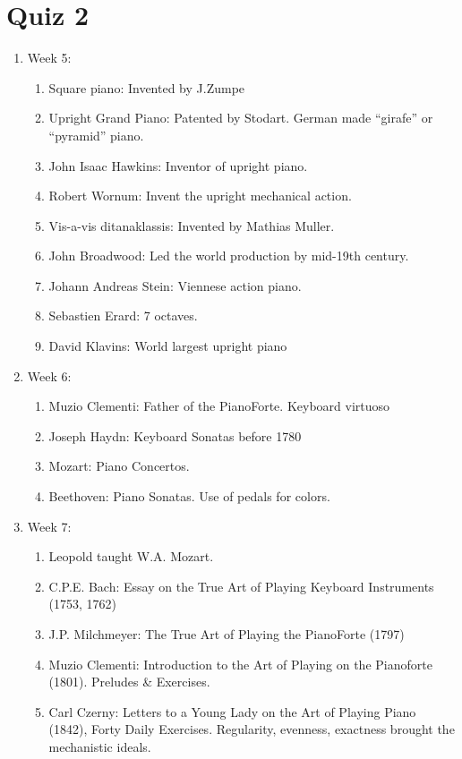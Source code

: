 \documentclass[math,code]{amznotes}
\theoremstyle{remark}
\begin{document}
\section{Quiz 2}
\begin{enumerate}
    \item Week 5:
    \begin{enumerate}
        \item Square piano: Invented by J.Zumpe
        \item Upright Grand Piano: Patented by Stodart. German made ``girafe'' or ``pyramid'' piano.
        \item John Isaac Hawkins: Inventor of upright piano.
        \item Robert Wornum: Invent the upright mechanical action.
        \item Vis-a-vis ditanaklassis: Invented by Mathias Muller.
        \item John Broadwood: Led the world production by mid-19th century.
        \item Johann Andreas Stein: Viennese action piano.
        \item Sebastien Erard: 7 octaves.
        \item David Klavins: World largest upright piano
    \end{enumerate}
    \item Week 6:
    \begin{enumerate}
        \item Muzio Clementi: Father of the PianoForte. Keyboard virtuoso
        \item Joseph Haydn: Keyboard Sonatas before 1780
        \item Mozart: Piano Concertos.
        \item Beethoven: Piano Sonatas. Use of pedals for colors.
    \end{enumerate}
    \item Week 7:
    \begin{enumerate}
        \item Leopold taught W.A. Mozart.
        \item C.P.E. Bach: Essay on the True Art of Playing Keyboard Instruments (1753, 1762)
        \item J.P. Milchmeyer: The True Art of Playing the PianoForte (1797)
        \item Muzio Clementi: Introduction to the Art of Playing on the Pianoforte (1801). Preludes \& Exercises.
        \item Carl Czerny: Letters to a Young Lady on the Art of Playing Piano (1842), Forty Daily Exercises. Regularity, evenness, exactness brought the mechanistic ideals.

\end{enumerate}
\end{enumerate}
\end{document}
